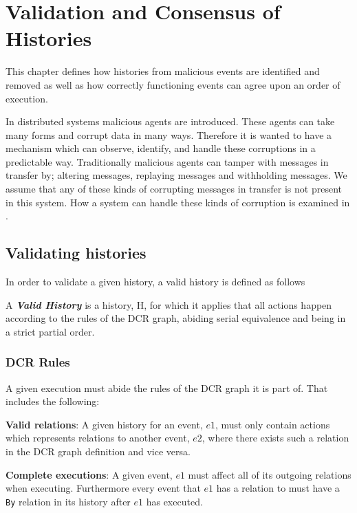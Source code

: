 \chapter{Validation and Consensus of Histories}
\label{chap:consensusindcr}
	This chapter defines how histories from malicious events are identified and removed as well as how correctly functioning events can agree upon an order of execution.
	
	\newpar In distributed systems malicious agents are introduced. These agents can take many forms and corrupt data in many ways. Therefore it is wanted to have a mechanism which can observe, identify, and handle these corruptions in a predictable way. Traditionally malicious agents can tamper with messages in transfer by; altering messages, replaying messages and withholding messages. We assume that any of these kinds of corrupting messages in transfer is not present in this system. How a system can handle these kinds of corruption is examined in .
	
	
	\section{Validating histories}
	In order to validate a given history, a valid history is defined as follows
	
		\begin{definition}
			A \textit{\textbf{Valid History}} is a history, H, for which it applies that all actions happen according to the rules of the DCR graph, abiding serial equivalence and being in a strict partial order. 
		\end{definition}
		
	\subsection{DCR Rules}
	A given execution must abide the rules of the DCR graph it is part of. That includes the following:
	
	\newpar \textbf{Valid relations}: A given history for an event, $e1$, must only contain actions which represents relations to another event, $e2$, where there exists such a relation in the DCR graph definition and vice versa. 
	
	\newpar \textbf{Complete executions}: A given event, $e1$ must affect all of its outgoing relations when executing. Furthermore every event that $e1$ has a relation to must have a \texttt{By} relation in its history after $e1$ has executed.
	

